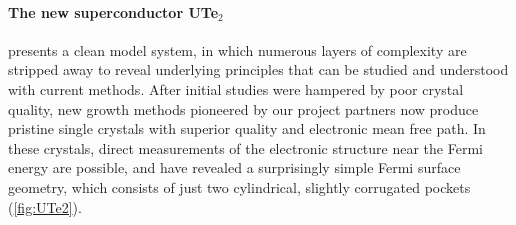 \paragraph{The new superconductor UTe$_2$} presents a clean model system, in which numerous layers of complexity are stripped away to reveal underlying principles that can be studied and understood with current methods. After initial studies were hampered by poor crystal quality, new growth methods pioneered by our project partners now produce pristine single crystals with superior quality and electronic mean free path. In these crystals, direct measurements of the electronic structure near the Fermi energy are possible, and have revealed a surprisingly simple Fermi surface geometry, which consists of just two cylindrical, slightly corrugated pockets (\autoref{fig:UTe2}).


